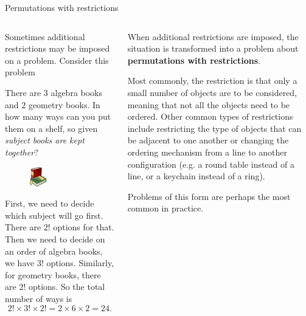 \documentclass[9pt,aspectratio=169]{beamer}
\begin{document}
\begin{frame}{Permutations with restrictions}
  \begin{columns}[T]
    \begin{column}{0.5\textwidth}
      Sometimes additional restrictions may be imposed on a problem. Consider this problem
      \begin{problem}
        There are $3$ algebra books and $2$ geometry books. In how many ways can you put them on a shelf, so given \emph{subject books are kept together}?        
      \end{problem}
      \begin{figure}\centering
        \includegraphics[width=0.3\textwidth]{02 - Combinatorics 101/books.png}
      \end{figure}

      First, we need to decide which subject will go first. There are $2!$ options for that. Then we need to decide on an order of algebra books, we have $3!$ options. Similarly, for geometry books, there are $2!$ options. So the total number of ways is
      \[
        2! \times 3! \times 2! = 2 \times 6 \times 2 = 24.
      \]
    \end{column}
    \begin{column}{0.5\textwidth}
      When additional restrictions are imposed, the situation is transformed into a problem about \textbf{permutations with restrictions}.\medskip

      Most commonly, the restriction is that only a small number of objects are to be considered, meaning that not all the objects need to be ordered. Other common types of restrictions include restricting the type of objects that can be adjacent to one another or changing the ordering mechanism from a line to another configuration (e.g. a round table instead of a line, or a keychain instead of a ring).\medskip

      Problems of this form are perhaps the most common in practice.

    \end{column}
  \end{columns}
\end{frame}
\end{document}
